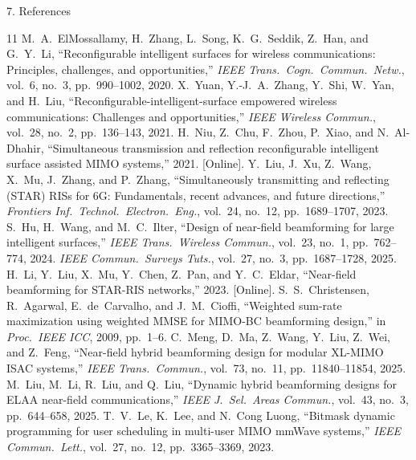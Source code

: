 \documentclass[aspectratio=169,11pt]{beamer}
\begin{document}
\begin{frame}{7. References}
\fontsize{6.1pt}{7.15pt}\selectfont
\begin{thebibliography}{11}
M.~A.~ElMossallamy, H.~Zhang, L.~Song, K.~G.~Seddik, Z.~Han, and G.~Y.~Li,
``Reconfigurable intelligent surfaces for wireless communications: Principles, challenges, and opportunities,''
\textit{IEEE Trans.\ Cogn.\ Commun.\ Netw.}, vol.~6, no.~3, pp.~990--1002, 2020.
X.~Yuan, Y.-J.~A.~Zhang, Y.~Shi, W.~Yan, and H.~Liu,
``Reconfigurable-intelligent-surface empowered wireless communications: Challenges and opportunities,''
\textit{IEEE Wireless Commun.}, vol.~28, no.~2, pp.~136--143, 2021.
H.~Niu, Z.~Chu, F.~Zhou, P.~Xiao, and N.~Al-Dhahir,
``Simultaneous transmission and reflection reconfigurable intelligent surface assisted MIMO systems,'' 2021. [Online].
Y.~Liu, J.~Xu, Z.~Wang, X.~Mu, J.~Zhang, and P.~Zhang,
``Simultaneously transmitting and reflecting (STAR) RISs for 6G: Fundamentals, recent advances, and future directions,''
\textit{Frontiers Inf.\ Technol.\ Electron.\ Eng.}, vol.~24, no.~12, pp.~1689--1707, 2023.
S.~Hu, H.~Wang, and M.~C.~Ilter,
``Design of near-field beamforming for large intelligent surfaces,''
\textit{IEEE Trans.\ Wireless Commun.}, vol.~23, no.~1, pp.~762--774, 2024.
\textit{IEEE Commun.\ Surveys Tuts.}, vol.~27, no.~3, pp.~1687--1728, 2025.
H.~Li, Y.~Liu, X.~Mu, Y.~Chen, Z.~Pan, and Y.~C.~Eldar,
``Near-field beamforming for STAR-RIS networks,'' 2023. [Online].
S.~S.~Christensen, R.~Agarwal, E.~de~Carvalho, and J.~M.~Cioffi,
``Weighted sum-rate maximization using weighted MMSE for MIMO-BC beamforming design,''
in \textit{Proc.\ IEEE ICC}, 2009, pp.~1--6.
C.~Meng, D.~Ma, Z.~Wang, Y.~Liu, Z.~Wei, and Z.~Feng,
``Near-field hybrid beamforming design for modular XL-MIMO ISAC systems,''
\textit{IEEE Trans.\ Commun.}, vol.~73, no.~11, pp.~11840--11854, 2025.
M.~Liu, M.~Li, R.~Liu, and Q.~Liu,
``Dynamic hybrid beamforming designs for ELAA near-field communications,''
\textit{IEEE J.\ Sel.\ Areas Commun.}, vol.~43, no.~3, pp.~644--658, 2025.
T.~V.~Le, K.~Lee, and N.~Cong Luong,
``Bitmask dynamic programming for user scheduling in multi-user MIMO mmWave systems,''
\textit{IEEE Commun.\ Lett.}, vol.~27, no.~12, pp.~3365--3369, 2023.
\end{thebibliography}
\end{frame}
\end{document}
